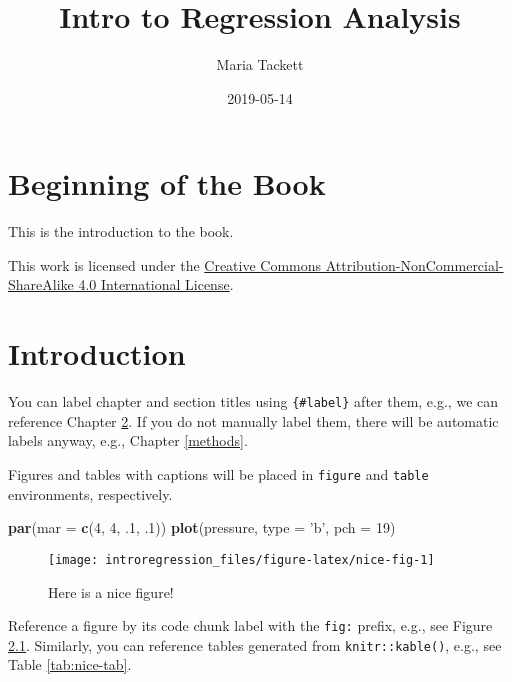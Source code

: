 \documentclass[]{book}
\title{Intro to Regression Analysis}
\author{Maria Tackett}
\date{2019-05-14}
\newenvironment{Shaded}{\begin{snugshade}}{\end{snugshade}}
\newcommand{\KeywordTok}[1]{\textcolor[rgb]{0.13,0.29,0.53}{\textbf{#1}}}
\newcommand{\DataTypeTok}[1]{\textcolor[rgb]{0.13,0.29,0.53}{#1}}
\newcommand{\DecValTok}[1]{\textcolor[rgb]{0.00,0.00,0.81}{#1}}
\newcommand{\StringTok}[1]{\textcolor[rgb]{0.31,0.60,0.02}{#1}}
\newcommand{\NormalTok}[1]{#1}
\begin{document}
\maketitle

{
\hypersetup{linkcolor=black}
\setcounter{tocdepth}{1}
\tableofcontents
}
\listoftables
\listoffigures
\chapter{Beginning of the Book}\label{beginning-of-the-book}

This is the introduction to the book.

This work is licensed under the
\href{http://creativecommons.org/licenses/by-nc-sa/4.0/}{Creative
Commons Attribution-NonCommercial-ShareAlike 4.0 International License}.

\chapter{Introduction}\label{intro}

You can label chapter and section titles using \texttt{\{\#label\}}
after them, e.g., we can reference Chapter \ref{intro}. If you do not
manually label them, there will be automatic labels anyway, e.g.,
Chapter \ref{methods}.

Figures and tables with captions will be placed in \texttt{figure} and
\texttt{table} environments, respectively.

\begin{Shaded}
\begin{Highlighting}[]
\KeywordTok{par}\NormalTok{(}\DataTypeTok{mar =} \KeywordTok{c}\NormalTok{(}\DecValTok{4}\NormalTok{, }\DecValTok{4}\NormalTok{, .}\DecValTok{1}\NormalTok{, .}\DecValTok{1}\NormalTok{))}
\KeywordTok{plot}\NormalTok{(pressure, }\DataTypeTok{type =} \StringTok{'b'}\NormalTok{, }\DataTypeTok{pch =} \DecValTok{19}\NormalTok{)}
\end{Highlighting}
\end{Shaded}

\begin{figure}

{\centering \texttt{[image: introregression\_files/figure-latex/nice-fig-1]} 

}

\caption{Here is a nice figure!}\label{fig:nice-fig}
\end{figure}

Reference a figure by its code chunk label with the \texttt{fig:}
prefix, e.g., see Figure \ref{fig:nice-fig}. Similarly, you can
reference tables generated from \texttt{knitr::kable()}, e.g., see Table
\ref{tab:nice-tab}.
\end{document}
